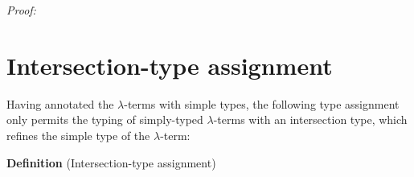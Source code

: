 \documentclass[a4paper, 12pt, twoside]{style/ociamthesis}
\theoremstyle{plain}
\theoremstyle{definition}
\theoremstyle{remark}
\newcommand{\concat}{\ensuremath{+\!\!\!\!+\,}}
\newcommand{\tocap}{\leadsto\kern-.5ex\cap}
\begin{document}
\emph{Proof:}


\section{Intersection-type
assignment}\label{intersection-type-assignment}

Having annotated the \(\lambda\)-terms with simple types, the following
type assignment only permits the typing of simply-typed
\(\lambda\)-terms with an intersection type, which refines the simple
type of the \(\lambda\)-term:

\textbf{Definition} (Intersection-type assignment)
\end{document}

